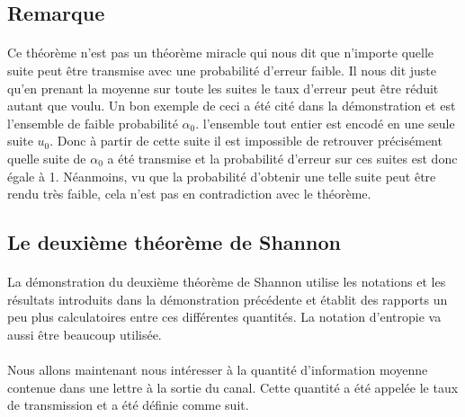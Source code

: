 \subsection*{Remarque}

	\paragraph{}
	Ce théorème n'est pas un théorème miracle qui nous dit que n'importe quelle
	suite peut être transmise avec une probabilité d'erreur faible.
	Il nous dit juste qu'en prenant la moyenne sur toute les suites le taux 
	d'erreur peut être réduit autant que voulu. Un bon exemple
	de ceci a été cité dans la démonstration et est l'ensemble de faible 
	probabilité $\alpha_0$. l'ensemble tout entier est encodé en une 
	seule suite $u_0$. Donc à partir de cette suite il est impossible 
	de retrouver précisément quelle suite de $\alpha_0$ a été transmise 
	et la probabilité d'erreur sur ces suites est donc égale à 1. 
	Néanmoins, vu que la probabilité d'obtenir une telle suite peut être 
	rendu très faible, cela n'est pas en contradiction avec le théorème.
	
	
	
	
	
	
	
	
	
	
	
	
	
\subsection{Le deuxième théorème de Shannon}

	\paragraph{}
	La démonstration du deuxième théorème de Shannon utilise 
	les notations et les résultats introduits dans la démonstration
	précédente et établit des rapports un peu plus calculatoires 
	entre ces différentes quantités. La notation d'entropie va
	aussi être beaucoup utilisée.

	\paragraph{}
	Nous allons maintenant nous intéresser à la quantité
	d'information moyenne contenue dans une lettre à la sortie
	du canal. Cette quantité a été appelée le taux de transmission
	et a été définie comme suit.
	
